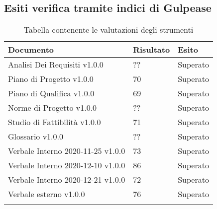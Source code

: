 \documentclass[../piano_di_qualifica.tex]{subfiles}
\begin{document}
\subsection{Esiti verifica tramite indici di Gulpease}
\label{sub:verif_gul}

\begin{center}
	\begin{longtable}{|p{4.5cm}|p{2.5cm}|p{3cm}|}
		\hline
		\rowcolor{lightgray}
            \textbf{Documento} & \textbf{Risultato} &  \textbf{Esito} \\
            \hline 
            Analisi Dei Requisiti v1.0.0 & ?? & Superato \\
            \hline
            \hline 
            Piano di Progetto v1.0.0 & 70 & Superato \\
            \hline 
            Piano di Qualifica v1.0.0 & 69 & Superato \\
            \hline 
            Norme di Progetto v1.0.0 & ?? & Superato \\
            \hline 
            Studio di Fattibilità v1.0.0 & 71 & Superato \\
            \hline 
            Glossario v1.0.0 & ?? & Superato \\
            \hline 
            Verbale Interno 2020-11-25 v1.0.0 & 73 & Superato \\
            \hline 
            Verbale Interno 2020-12-10 v1.0.0 & 86 & Superato \\
            \hline 
            Verbale Interno 2020-12-21 v1.0.0 & 72 & Superato \\
            \hline 
            Verbale esterno v1.0.0 & 76 & Superato \\
            \hline
            \hline

\caption{Tabella contenente le valutazioni degli strumenti}
\end{longtable}
\end{center}
\end{document}
